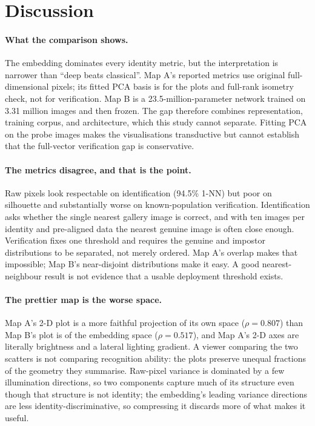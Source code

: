 \section{Discussion}\label{sec:discussion}

\paragraph{What the comparison shows.} The embedding dominates every identity metric, but the interpretation is narrower than ``deep beats classical''. Map A's reported metrics use original full-dimensional pixels; its fitted PCA basis is for the plots and full-rank isometry check, not for verification. Map B is a 23.5-million-parameter network trained on 3.31 million images and then frozen. The gap therefore combines representation, training corpus, and architecture, which this study cannot separate. Fitting PCA on the probe images makes the visualisations transductive but cannot establish that the full-vector verification gap is conservative.

\paragraph{The metrics disagree, and that is the point.} Raw pixels look respectable on identification (94.5\% 1-NN) but poor on silhouette and substantially worse on known-population verification. Identification asks whether the single nearest gallery image is correct, and with ten images per identity and pre-aligned data the nearest genuine image is often close enough. Verification fixes one threshold and requires the genuine and impostor distributions to be separated, not merely ordered. Map A's overlap makes that impossible; Map B's near-disjoint distributions make it easy. A good nearest-neighbour result is not evidence that a usable deployment threshold exists.

\paragraph{The prettier map is the worse space.} Map A's 2-D plot is a more faithful projection of its own space ($\rho=0.807$) than Map B's plot is of the embedding space ($\rho=0.517$), and Map A's 2-D axes are literally brightness and a lateral lighting gradient. A viewer comparing the two scatters is not comparing recognition ability: the plots preserve unequal fractions of the geometry they summarise. Raw-pixel variance is dominated by a few illumination directions, so two components capture much of its structure even though that structure is not identity; the embedding's leading variance directions are less identity-discriminative, so compressing it discards more of what makes it useful.

